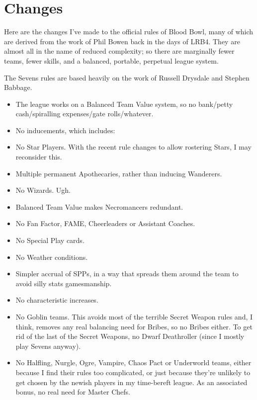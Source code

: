 \section{Changes}

\begin{multicols}{2}

\par Here are the changes I've made to the official rules of Blood Bowl, many of which are derived from the work of Phil Bowen back in the days of LRB4. They are almost all in the name of reduced complexity; so there are marginally fewer teams, fewer skills, and a balanced, portable, perpetual league system.
\par The Sevens rules are based heavily on the work of Russell Drysdale and Stephen Babbage.

\begin{itemize}
\item The league works on a Balanced Team Value system, so no bank/petty cash/spiralling expenses/gate rolls/whatever.
\item No inducements, which includes:
\item No Star Players. With the recent rule changes to allow rostering Stars, I may reconsider this.
\item Multiple permanent Apothecaries, rather than inducing Wanderers.
\item No Wizards. Ugh.
\item Balanced Team Value makes Necromancers redundant.
\item No Fan Factor, FAME, Cheerleaders or Assistant Coaches.
\item No Special Play cards.
\item No Weather conditions.
\item Simpler accrual of SPPs, in a way that spreads them around the team to avoid silly stats gamesmanship.
\item No characteristic increases.
\item No Goblin teams. This avoids most of the terrible Secret Weapon rules and, I think, removes any real balancing need for Bribes, so no Bribes either. To get rid of the last of the Secret Weapons, no Dwarf Deathroller (since I mostly play Sevens anyway).
\item No Halfling, Nurgle, Ogre, Vampire, Chaos Pact or Underworld teams, either because I find their rules too complicated, or just because they're unlikely to get chosen by the newish players in my time-bereft league. As an associated bonus, no real need for Master Chefs.

\end{itemize}
\end{multicols}
